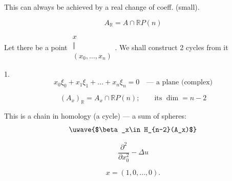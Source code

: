 This can always be achieved by a real change of coeff. (small).



\begin{equation*}A_{\mathbb R}=A\cap\mathbb RP (n)\end{equation*}



Let there be a point $\begin{gathered}x\\\Vert\\(x_0,\ldots, x_n)\end{gathered}$.
We shall construct 2 cycles from it



1.
\begin{equation*}x_0\xi_0+x_1\xi_1+\ldots+x_n\xi_n=0\quad\text{--- a plane (complex)}\end{equation*}











\begin{equation*}(A_x)_{\mathbb R}=A_x\cap\mathbb RP (n);\qquad\text{its }\dim=n-2\end{equation*}



This is a chain in homology (a cycle) --- a sum of spheres:
\begin{equation*}\text{\uwave{$\beta_x\in H_{n-2}(A_x)$}}\end{equation*}






\begin{equation*}\frac{\partial^2}{\partial x_0^2}-\Delta u\end{equation*}



\begin{equation*}x=(1,0,\ldots,0).\end{equation*}




